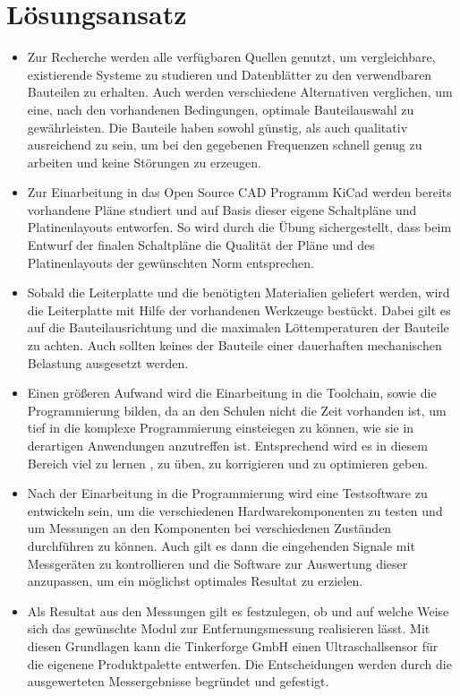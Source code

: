 \section{Lösungsansatz}
\begin{itemize}
\item Zur Recherche werden alle verfügbaren Quellen genutzt, um vergleichbare, existierende Systeme zu studieren und Datenblätter zu den verwendbaren Bauteilen zu erhalten. Auch werden verschiedene Alternativen verglichen, um eine, nach den vorhandenen Bedingungen, optimale Bauteilauswahl zu gewährleisten. Die Bauteile haben sowohl günstig, als auch qualitativ ausreichend zu sein, um bei den gegebenen Frequenzen schnell genug zu arbeiten und keine Störungen zu erzeugen.
\item Zur Einarbeitung in das Open Source CAD Programm KiCad werden bereits vorhandene Pläne studiert und auf Basis dieser eigene Schaltpläne und Platinenlayouts entworfen. So wird durch die Übung sichergestellt, dass beim Entwurf der finalen Schaltpläne die Qualität der Pläne und des Platinenlayouts der gewünschten Norm entsprechen.
\item Sobald die Leiterplatte und die benötigten Materialien geliefert werden, wird die Leiterplatte mit Hilfe der vorhandenen Werkzeuge bestückt. Dabei gilt es auf die Bauteilausrichtung und die maximalen Löttemperaturen der Bauteile zu achten. Auch sollten keines der Bauteile einer dauerhaften mechanischen Belastung ausgesetzt werden.
\item Einen größeren Aufwand wird die Einarbeitung in die Toolchain, sowie die Programmierung bilden, da an den Schulen nicht die Zeit vorhanden ist, um tief in die komplexe Programmierung einsteiegen zu können, wie sie in derartigen Anwendungen anzutreffen ist. Entsprechend wird es in diesem Bereich viel zu lernen , zu üben, zu korrigieren und zu optimieren geben.
\item Nach der Einarbeitung in die Programmierung wird eine Testsoftware zu entwickeln sein, um die verschiedenen Hardwarekomponenten zu testen und um Messungen an den Komponenten bei verschiedenen Zuständen durchführen zu können. Auch gilt es dann die eingehenden Signale mit Messgeräten zu kontrollieren und die Software zur Auswertung dieser anzupassen, um ein möglichst optimales Resultat zu erzielen.
\item Als Resultat aus den Messungen gilt es festzulegen, ob und auf welche Weise sich das gewünschte Modul zur Entfernungsmessung realisieren lässt. Mit diesen Grundlagen kann die Tinkerforge GmbH einen  Ultraschallsensor für die eigenene Produktpalette entwerfen. Die Entscheidungen werden durch die ausgewerteten Messergebnisse begründet und gefestigt.
\end{itemize}
